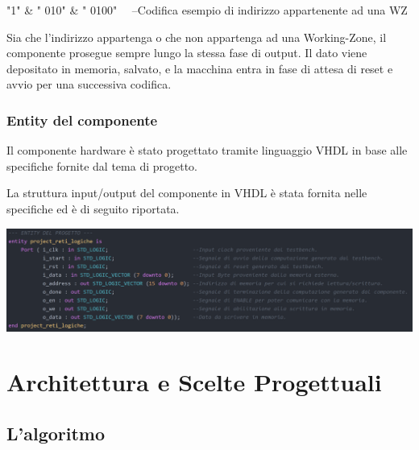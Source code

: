 \documentclass{article}
\newenvironment{gitFont}{\fontfamily{zi4}\selectfont}{\par}
\begin{document}
\begin{flushleft}
\bigskip


\begin{gitFont}

"1" \& " 010" \& " 0100"  \ \ --Codifica esempio di indirizzo appartenente ad una WZ

\end{gitFont}


\bigskip

Sia che l'indirizzo appartenga o che non appartenga ad una Working-Zone, il componente prosegue sempre lungo la stessa fase di output. Il dato viene depositato in memoria, salvato, e la macchina entra in fase di attesa di reset e avvio per una successiva codifica.
\end{flushleft}
\subsubsection{Entity del componente}

Il componente hardware è stato progettato tramite linguaggio VHDL in base alle specifiche fornite dal tema di progetto.

La struttura input/output del componente in VHDL è stata fornita nelle specifiche ed è di seguito riportata.


\begin{center}
\includegraphics[scale=0.27]{Entity}
\end{center}


\section{Architettura e Scelte Progettuali}

\subsection{L'algoritmo}
\end{document}
